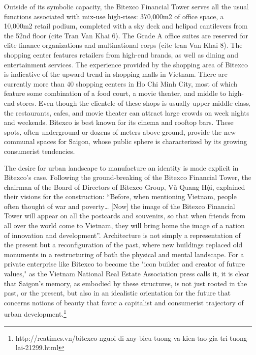 Outside of its symbolic capacity, the Bitexco Financial Tower serves all the usual functions associated with mix-use high-rises: 370,000m2 of office space, a 10,000m2 retail podium, completed with a sky deck and helipad cantilevers from the 52nd floor (cite Tran Van Khai 6). The Grade A office suites are reserved for elite finance organizations and multinational corps (cite tran Van Khai 8). The shopping center features retailers from high-end brands, as well as dining and entertainment services.  The experience provided by the shopping area of Bitexco is indicative of the upward trend in shopping malls in Vietnam. There are currently more than 40 shopping centers in Ho Chi Minh City, most of which feature some combination of a food court, a movie theater, and middle to high-end stores.  Even though the clientele of these shops is usually upper middle class, the restaurants, cafes, and movie theater can attract large crowds on week nights and weekends. Bitexco is best known for its cinema and rooftop bars. These spots, often underground or dozens of meters above ground, provide the new communal spaces for Saigon, whose public sphere is characterized by its growing consumerist tendencies.

The desire for urban landscape to manufacture an identity is made explicit in Bitexco’s case. Following the ground-breaking of the Bitexco Financial Tower, the chairman of the Board of Directors of Bitexco Group, Vũ Quang Hội, explained their visions for the construction: “Before, when mentioning Vietnam, people often thought of war and poverty… [Now] the image of the Bitexco Financial Tower will appear on all the postcards and souvenirs, so that when friends from all over the world come to Vietnam, they will bring home the image of a nation of innovation and development”. Architecture is not simply a representation of the present but a reconfiguration of the past, where new buildings replaced old monuments in a restructuring of both the physical and mental landscape. For a private enterprise like Bitexco to become the "icon builder and creator of future values," as the Vietnam National Real Estate Association press calls it, it is clear that Saigon's memory, as embodied by these structures, is not just rooted in the past, or the present, but also in an idealistic orientation for the future that concerns notions of beauty that favor a capitalist and consumerist trajectory of urban development.\footnote{http://reatimes.vn/bitexco-nguoi-di-xay-bieu-tuong-va-kien-tao-gia-tri-tuong-lai-21299.html}
